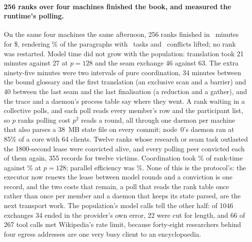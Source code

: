 \paragraph{256 ranks over four machines finished the book, and measured the
runtime's polling.} On the same four machines the same afternoon, 256 ranks
finished in \eSevenWallTwofiftysix\ minutes for \$\eSevenCostTwofiftysix,
rendering \eSevenCoverageTwofiftysix\% of the paragraphs with
\eSevenTasksTwofiftysix\ tasks and \eSevenConflictsTwofiftysix\ conflicts
lifted; no rank was restarted. Model time did not grow with the population:
translation took 21 minutes against 27 at $p=128$ and the seam exchange 46
against 63. The extra ninety-five minutes were two intervals of pure
coordination, 34 minutes between the bound glossary and the first translation
(an exclusive scan and a barrier) and 40 between the last seam and the last
finalisation (a reduction and a gather), and the trace and a daemon's process
table say where they went. A rank waiting in a collective polls, and each poll
reads every member's row and the participant list, so $p$ ranks polling cost
$p^2$ reads a round, all through one daemon per machine that also parses a 38~MB
state file on every commit; node~0's daemon ran at 85\% of a core with 64
clients. Twelve ranks whose research or seam task outlasted the 1800-second
lease were convicted alive, and every polling peer convicted each of them again,
355 records for twelve victims. Coordination took
\eSevenCoordShareTwofiftysix\% of rank-time against
\eSevenCoordShareOnetwentyeight\% at $p=128$; parallel efficiency was
\eSevenEfficiencyTwofiftysix\%. None of this is the protocol's: the executor now
renews the lease between model rounds and a conviction is one record, and the
two costs that remain, a poll that reads the rank table once rather than once
per member and a daemon that keeps its state parsed, are the next transport
work. The population's model calls tell the other half: of 1046 exchanges 34
ended in the provider's own error, 22 were cut for length, and 66 of 267 tool
calls met Wikipedia's rate limit, because forty-eight researchers behind four
egress addresses are one very busy client to an encyclopaedia.
